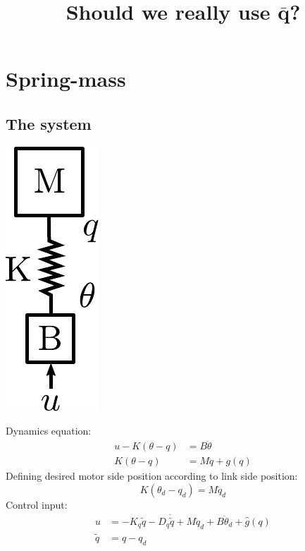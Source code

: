 \documentclass[11pt]{article}
\date{}
\newcommand{\vect}[1]{\boldsymbol{#1}}
\begin{document}
%
\title{Should we really use $\bar{\vect{q}}$? 
\footnotesize }
\maketitle
%
\section{Spring-mass}
\subsection{The system}
\begin{center}
\includegraphics[scale=0.6]{drawing.pdf} 
\end{center}
Dynamics equation: 
\begin{align}
u - K(\theta-q) &= B \ddot{\theta} \\
K(\theta - q) &= M \ddot{q} + g(q)
\end{align}
Defining desired motor side position according to link side position: 
\begin{equation}
K(\theta_d-q_d) = M\ddot{q}_d 
\end{equation}
Control input:
\begin{align}
u &= - K_q \tilde{q} - D_q \dot{\tilde{q}} + M \ddot{q}_d + B\ddot{\theta}_d + \hat{g}(q) \\
\tilde{q} &= q - q_d \nonumber
\end{align}
\end{document}
